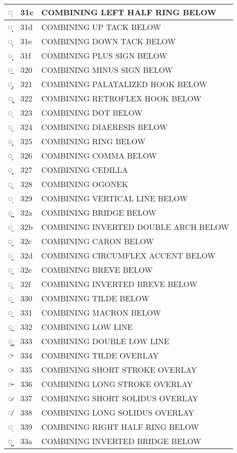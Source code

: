 \documentclass[12pt,letterpaper,openany]{book}
\begin{document}
\begin{center}
\begin{supertabular}{|m{0.25in}|m{0.5in}|m{4in}|}
◌̜ & 31c & COMBINING LEFT HALF RING BELOW\\\hline
◌̝ & 31d & COMBINING UP TACK BELOW\\\hline
◌̞ & 31e & COMBINING DOWN TACK BELOW\\\hline
◌̟ & 31f & COMBINING PLUS SIGN BELOW\\\hline
◌̠ & 320 & COMBINING MINUS SIGN BELOW\\\hline
◌̡ & 321 & COMBINING PALATALIZED HOOK BELOW\\\hline
◌̢ & 322 & COMBINING RETROFLEX HOOK BELOW\\\hline
◌̣ & 323 & COMBINING DOT BELOW\\\hline
◌̤ & 324 & COMBINING DIAERESIS BELOW\\\hline
◌̥ & 325 & COMBINING RING BELOW\\\hline
◌̦ & 326 & COMBINING COMMA BELOW\\\hline
◌̧ & 327 & COMBINING CEDILLA\\\hline
◌̨ & 328 & COMBINING OGONEK\\\hline
◌̩ & 329 & COMBINING VERTICAL LINE BELOW\\\hline
◌̪ & 32a & COMBINING BRIDGE BELOW\\\hline
◌̫ & 32b & COMBINING INVERTED DOUBLE ARCH BELOW\\\hline
◌̬ & 32c & COMBINING CARON BELOW\\\hline
◌̭ & 32d & COMBINING CIRCUMFLEX ACCENT BELOW\\\hline
◌̮ & 32e & COMBINING BREVE BELOW\\\hline
◌̯ & 32f & COMBINING INVERTED BREVE BELOW\\\hline
◌̰ & 330 & COMBINING TILDE BELOW\\\hline
◌̱ & 331 & COMBINING MACRON BELOW\\\hline
◌̲ & 332 & COMBINING LOW LINE\\\hline
◌̳ & 333 & COMBINING DOUBLE LOW LINE\\\hline
◌̴ & 334 & COMBINING TILDE OVERLAY\\\hline
◌̵ & 335 & COMBINING SHORT STROKE OVERLAY\\\hline
◌̶ & 336 & COMBINING LONG STROKE OVERLAY\\\hline
◌̷ & 337 & COMBINING SHORT SOLIDUS OVERLAY\\\hline
◌̸ & 338 & COMBINING LONG SOLIDUS OVERLAY\\\hline
◌̹ & 339 & COMBINING RIGHT HALF RING BELOW\\\hline
◌̺ & 33a & COMBINING INVERTED BRIDGE BELOW\\\hline

\end{supertabular}
\end{center}
\end{document}
